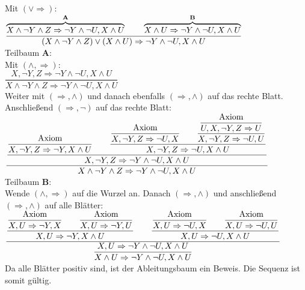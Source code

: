 \documentclass[11pt, a4paper]{article}
\begin{document}
\begin{adjustwidth}{20pt}{20pt}
Mit $(\vee \Rightarrow)$:\\

$
\dfrac
{\overbrace{X \wedge \neg Y \wedge Z \Rightarrow \neg Y \wedge \neg U, X \wedge U}^{\textbf{A}} \text{\qquad} \overbrace{X \wedge U\Rightarrow \neg Y \wedge \neg U, X \wedge U}^{\textbf{B}}}
{(X \wedge \neg Y \wedge Z)\vee(X \wedge U)\Rightarrow \neg Y \wedge \neg U, X \wedge U}
$\\

Teilbaum \textbf{A}:\\

Mit $(\wedge,\Rightarrow)$:\\

$
\dfrac
{X , \neg Y , Z \Rightarrow \neg Y \wedge \neg U, X \wedge U}
{X \wedge \neg Y \wedge Z \Rightarrow \neg Y \wedge \neg U, X \wedge U}
$\\

Weiter mit $(\Rightarrow, \wedge)$ und danach ebenfalls $(\Rightarrow, \wedge)$ auf das rechte Blatt. Anschließend $(\Rightarrow, \neg)$ auf das rechte Blatt:\\

$
\dfrac
{\dfrac
 {\dfrac{\text{Axiom}}{X , \neg Y , Z \Rightarrow \neg Y, X \wedge U} \text{\qquad} 
  \dfrac
  {\dfrac
  {\text{Axiom}}
  {X , \neg Y , Z \Rightarrow  \neg U, X}  \text{\qquad} 
   \dfrac
   {\dfrac
  {\text{Axiom}}
  {U, X , \neg Y , Z \Rightarrow U}}
   {X , \neg Y , Z \Rightarrow  \neg U, U}}
  {X , \neg Y , Z \Rightarrow  \neg U, X \wedge U}}
 {X , \neg Y , Z \Rightarrow \neg Y \wedge \neg U, X \wedge U}}
{X \wedge \neg Y \wedge Z \Rightarrow \neg Y \wedge \neg U, X \wedge U}
$\\

Teilbaum \textbf{B}:\\

Wende $(\wedge,\Rightarrow)$ auf die Wurzel an. Danach $(\Rightarrow, \wedge)$ und anschließend $(\Rightarrow, \wedge)$ auf alle Blätter:\\

$
\dfrac
{	\dfrac{ \dfrac
  {\text{Axiom}}
  {X , U \Rightarrow \neg Y , X} \text{\qquad} \dfrac
  {\text{Axiom}}
  {X , U \Rightarrow \neg Y , U}}
	{X , U \Rightarrow \neg Y , X \wedge U} \text{\qquad} 
	\dfrac{\dfrac
  {\text{Axiom}}
  {X , U \Rightarrow \neg U , X}\text{\qquad}\dfrac
  {\text{Axiom}}
  {X , U \Rightarrow \neg U , U}}
	{X , U \Rightarrow  \neg U, X \wedge U}}
{
\dfrac
{X , U\Rightarrow \neg Y \wedge \neg U, X \wedge U}
{X \wedge U\Rightarrow \neg Y \wedge \neg U, X \wedge U}
}
$\\

Da alle Blätter positiv sind, ist der Ableitungsbaum ein Beweis. Die Sequenz ist somit gültig.
\end{adjustwidth}
\end{document}
